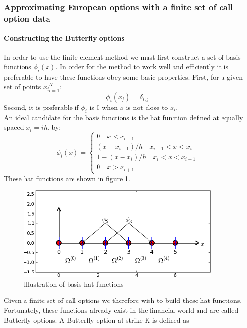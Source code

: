 \documentclass[a4paper,12pt]{article}
\begin{document}
\subsubsection{Approximating European options with a finite set of call option data}
\paragraph{Constructing the Butterfly options}
In order to use the finite element method we must first construct a set of basis functions $\phi_i(x)$. In order for the method to work well and efficiently it is preferable to have these functions obey some basic properties. First, for a given set of points ${x_i}_{i=1}^N$:
\begin{equation}
    \phi_i(x_j) = \delta_{i,j}
\end{equation}
Second, it is preferable if $\phi_i$ is 0 when $x$ is not close to $x_i$.\\
An ideal candidate for the basis functions is the hat function defined at equally spaced $x_i = ih$, by:
\begin{equation}
    \phi_i(x) = \left\{
\begin{array}{ll}
      0 \quad x< x_{i-1} \\
      (x-x_{i-1})/h \quad x_{i-1} < x < x_i \\
      1 - (x-x_i)/h \quad x_i < x < x_{i+1} \\
      0 \quad x > x_{i+1}
\end{array} 
\right. 
\end{equation}
These hat functions are shown in figure \ref{fig:fem_hat_fcts}.
\begin{figure} [H]
    \centering
    \includegraphics[width=0.9\textwidth]{fem_hat_fcts.png}
    \caption{Illustration of basis hat functions \cite{fem_paper}}
    \label{fig:fem_hat_fcts}
\end{figure}
\noindent Given a finite set of call options we therefore wish to build these hat functions. Fortunately, these functions already exist in the financial world and are called Butterfly options. A Butterfly option at strike K is defined as 
\end{document}
